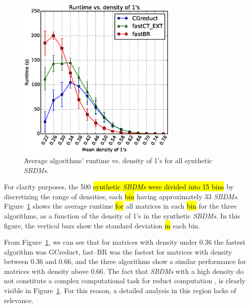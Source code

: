\documentclass[number,preprint,review,12pt]{elsarticle}
\begin{document}
	\begin{figure}[htb]
		\begin{center}
			\includegraphics[height=8cm]{overal.eps}
		\end{center}
		\caption{Average algorithms' runtime vs. density of 1's for all synthetic \textit{SBDMs}.}
		\label{fig:scattDensity}
	\end{figure}	

	For clarity purposes, the 500 \hl{synthetic \textit{SBDMs} were divided into 15 bins} by discretizing the range of densities, each \hl{bin} having approximately 33 \textit{SBDMs}. Figure~\ref{fig:scattDensity} shows the average runtime \hl{for} all  matrices in each \hl{bin} for the three algorithms, as a function of the density of 1's in the synthetic \textit{SBDMs}. In this figure, the vertical bars show the standard deviation \hl{in} each bin. 
		
	From Figure~\ref{fig:scattDensity}, we can see that for matrices with density under 0.36  the fastest algorithm was GCreduct, fast--BR was the fastest for matrices with density between 0.36 and 0.66, and the three algorithms show a similar performance for matrices with density above 0.66. The fact that \textit{SBDMs} with a high density do not constitute a complex computational task for reduct computation \citep{Rojas12}, is clearly visible in Figure~\ref{fig:scattDensity}. For this reason, a detailed analysis in this region lacks of relevance.
		
\end{document}
